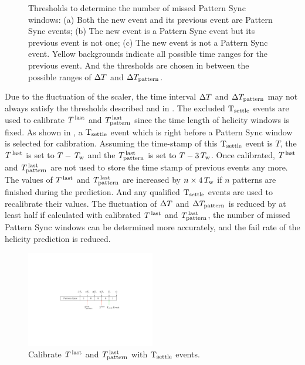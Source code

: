 \begin{figure}[tb!]
\begin{subfigure}[t]{\textwidth}
    \caption{\label{A1S2SS2F3c}}
  \end{subfigure}
  \caption[Predict actual TIR helicity.]{Thresholds to determine the number of missed Pattern Sync windows: (a) Both the new event and its previous event are Pattern Sync events; (b) The new event is a Pattern Sync event but its previous event is not one; (c) The new event is not a Pattern Sync event. Yellow backgrounds indicate all possible time ranges for the previous event. And the thresholds are chosen in between the possible ranges of $\Delta T$ and $\Delta T_{\text{pattern}}$. \label{A1S2SS2F3}}
\end{figure}

Due to the fluctuation of the scaler, the time interval $\Delta T$ and $\Delta T_{\text{pattern}}$ may not always satisfy the thresholds described and in . The excluded $\mathrm{T}_{\mathrm{settle}}$ events are used to calibrate $T^{\,\text{last}}$ and $T^{\,\text{last}}_{\text{pattern}}$ since the time length of helicity windows is fixed. As shown in , a $\mathrm{T}_{\mathrm{settle}}$ event which is right before a Pattern Sync window is selected for calibration. Assuming the time-stamp of this $\mathrm{T}_{\mathrm{settle}}$ event is $T$, the $T^{\,\text{last}}$ is set to $T-\,T_{\text{w}}$ and the $T^{\,\text{last}}_{\text{pattern}}$ is set to $T-3\,T_{\text{w}}$. Once calibrated, $T^{\,\text{last}}$ and $T^{\,\text{last}}_{\text{pattern}}$ are not used to store the time stamp of previous events any more. The values of $T^{\,\text{last}}$ and $T^{\,\text{last}}_{\text{pattern}}$ are increased by $n\times4\,T_{\text{w}}$ if $n$ patterns are finished during the prediction. And any qualified $\mathrm{T}_{\mathrm{settle}}$ events are used to recalibrate their values. The fluctuation of $\Delta T$ and $\Delta T_{\text{pattern}}$ is reduced by at least half if calculated with calibrated $T^{\,\text{last}}$ and $T^{\,\text{last}}_{\text{pattern}}$, the number of missed Pattern Sync windows can be determined more accurately, and the fail rate of the helicity prediction is reduced.

\begin{figure}[tb!]
  \centering
  \includegraphics[width=0.5\textwidth]{figs/tir-helicity-tsettle-calibration.pdf}
  \caption{Calibrate $T^{\,\text{last}}$ and $T^{\,\text{last}}_{\text{pattern}}$ with $\mathrm{T}_{\mathrm{settle}}$ events. \label{A1S2SS2F4}}
\end{figure}

